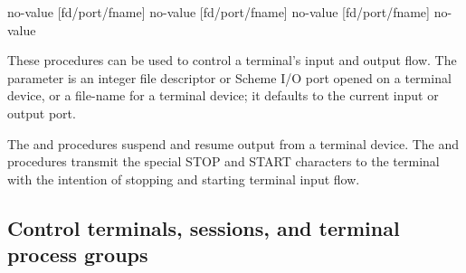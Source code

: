  {no-value}
 {[fd/port/fname]} {no-value}
 {[fd/port/fname]} {no-value}
  {[fd/port/fname]} {no-value}
\begin{desc}
These procedures can be used to control a terminal's input and output flow.
The  parameter is an integer file descriptor or 
Scheme I/O port opened on a terminal device, 
or a file-name for a terminal device; it defaults to the current input
or output port.

The  and  procedures suspend
and resume output from a terminal device.
The  and  procedures transmit
the special STOP and START characters to the terminal with the intention
of stopping and starting terminal input flow.
\end{desc}

% 

\subsection{Control terminals, sessions, and terminal process groups}

